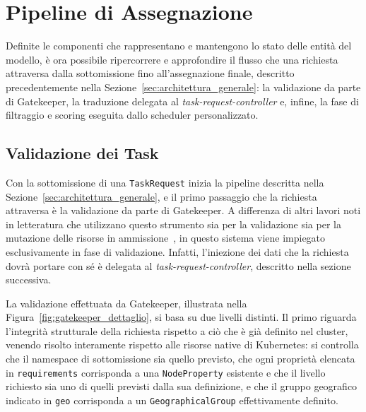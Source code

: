 
\section{Pipeline di Assegnazione}
\label{sec:pipeline_assegnazione}

Definite le componenti che rappresentano e mantengono lo stato delle entità del modello, è ora possibile ripercorrere e approfondire il flusso che una richiesta attraversa dalla sottomissione fino all'assegnazione finale, descritto precedentemente nella Sezione~\ref{sec:architettura_generale}: la validazione da parte di Gatekeeper, la traduzione delegata al \emph{task-request-controller} e, infine, la fase di filtraggio e scoring eseguita dallo scheduler personalizzato.


\subsection{Validazione dei Task}
\label{subsec:gatekeeper_validation}

Con la sottomissione di una \texttt{TaskRequest} inizia la pipeline descritta nella Sezione~\ref{sec:architettura_generale}, e il primo passaggio che la richiesta attraversa è la validazione da parte di Gatekeeper. A differenza di altri lavori noti in letteratura che utilizzano questo strumento sia per la validazione sia per la mutazione delle risorse in ammissione~\cite{policy-driven-sec-aware-scheduling-k8s, secure-k8s-workload-deployment}, in questo sistema viene impiegato esclusivamente in fase di validazione. Infatti, l'iniezione dei dati che la richiesta dovrà portare con sé è delegata al \emph{task-request-controller}, descritto nella sezione successiva.

La validazione effettuata da Gatekeeper, illustrata nella Figura~\ref{fig:gatekeeper_dettaglio}, si basa su due livelli distinti. Il primo riguarda l'integrità strutturale della richiesta rispetto a ciò che è già definito nel cluster, venendo risolto interamente rispetto alle risorse native di Kubernetes: si controlla che il namespace di sottomissione sia quello previsto, che ogni proprietà elencata in \texttt{requirements} corrisponda a una \texttt{NodeProperty} esistente e che il livello richiesto sia uno di quelli previsti dalla sua definizione, e che il gruppo geografico indicato in \texttt{geo} corrisponda a un \texttt{GeographicalGroup} effettivamente definito.

